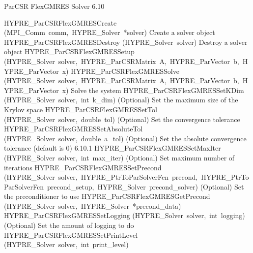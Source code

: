 \documentclass{article}
\begin{document}
\begin{cxxentry}
\begin{cxxentry}
\begin{cxxfunction}
\begin{cxxdoc}
\end{cxxdoc}
\end{cxxfunction}
\end{cxxentry}
\begin{cxxentry}
{}
        {ParCSR FlexGMRES Solver}
        {}
        {
}
        {6.10}
\begin{cxxnames}
        {HYPRE\_ParCSRFlexGMRESCreate}
        {(MPI\_Comm\ comm,\ HYPRE\_Solver\ *solver)}
        {
Create a solver object}
        {}
\label{cxx.6.10.2}
        {HYPRE\_ParCSRFlexGMRESDestroy}
        {(HYPRE\_Solver\ solver)}
        {
Destroy a solver object}
        {}
\label{cxx.6.10.3}
        {HYPRE\_ParCSRFlexGMRESSetup}
        {(HYPRE\_Solver\ solver,\ HYPRE\_ParCSRMatrix\ A,\ HYPRE\_ParVector\ b,\ HYPRE\_ParVector\ x)}
        {}
        {}
\label{cxx.6.10.4}
        {HYPRE\_ParCSRFlexGMRESSolve}
        {(HYPRE\_Solver\ solver,\ HYPRE\_ParCSRMatrix\ A,\ HYPRE\_ParVector\ b,\ HYPRE\_ParVector\ x)}
        {
Solve the system}
        {}
\label{cxx.6.10.5}
        {HYPRE\_ParCSRFlexGMRESSetKDim}
        {(HYPRE\_Solver\ solver,\ int\ k\_dim)}
        {
(Optional) Set the maximum size of the Krylov space}
        {}
\label{cxx.6.10.6}
        {HYPRE\_ParCSRFlexGMRESSetTol}
        {(HYPRE\_Solver\ solver,\ double\ tol)}
        {
(Optional) Set the convergence tolerance}
        {}
\label{cxx.6.10.7}
        {HYPRE\_ParCSRFlexGMRESSetAbsoluteTol}
        {(HYPRE\_Solver\ solver,\ double\ a\_tol)}
        {
(Optional) Set the absolute convergence tolerance (default is 0)}
        {6.10.1}
        {HYPRE\_ParCSRFlexGMRESSetMaxIter}
        {(HYPRE\_Solver\ solver,\ int\ max\_iter)}
        {
(Optional) Set maximum number of iterations}
        {}
\label{cxx.6.10.8}
        {HYPRE\_ParCSRFlexGMRESSetPrecond}
        {(HYPRE\_Solver\ solver,\ HYPRE\_PtrToParSolverFcn\ precond,\ HYPRE\_PtrToParSolverFcn\ precond\_setup,\ HYPRE\_Solver\ precond\_solver)}
        {
(Optional) Set the preconditioner to use}
        {}
\label{cxx.6.10.9}
        {HYPRE\_ParCSRFlexGMRESGetPrecond}
        {(HYPRE\_Solver\ solver,\ HYPRE\_Solver\ *precond\_data)}
        {}
        {}
\label{cxx.6.10.10}
        {HYPRE\_ParCSRFlexGMRESSetLogging}
        {(HYPRE\_Solver\ solver,\ int\ logging)}
        {
(Optional) Set the amount of logging to do}
        {}
\label{cxx.6.10.11}
        {HYPRE\_ParCSRFlexGMRESSetPrintLevel}
        {(HYPRE\_Solver\ solver,\ int\ print\_level)}

\end{cxxnames}
\end{cxxentry}
\end{cxxentry}
\end{document}
